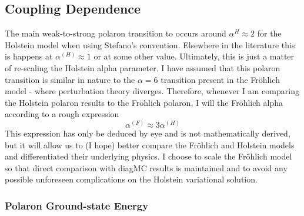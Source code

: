 \subsection{Coupling Dependence}

The main weak-to-strong polaron transition to occurs around $\alpha^{{H}} \approx 2$ for the Holstein model when using Stefano's convention. Elsewhere in the literature this is happens at $\alpha^{(H)} \approx 1$ or at some other value. Ultimately, this is just a matter of re-scaling the Holstein alpha parameter. I have assumed that this polaron transition is similar in nature to the $\alpha = 6$ transition present in the Fr\"ohlich model - where perturbation theory diverges. Therefore, whenever I am comparing the Holstein polaron results to the Fr\"ohlich polaron, I will  the Fr\"ohlich alpha according to a rough expression
\begin{equation}
    \alpha^{(F)} \approx 3 \alpha^{(H)}
\end{equation}
This expression has only be deduced by eye and is not mathematically derived, but it will allow us to (I hope) better compare the Fr\"ohlich and Holstein models and differentiated their underlying physics. I choose to scale the Fr\"ohlich model so that direct comparison with diagMC results is maintained and to avoid any possible unforeseen complications on the Holstein variational solution.

\subsubsection{Polaron Ground-state Energy}

